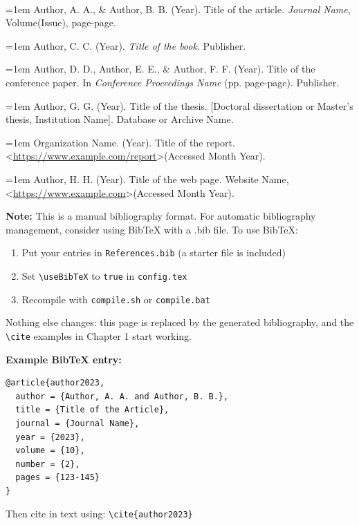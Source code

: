 
%
\begin{center}
\vspace*{2\baselineskip}
{\bf\fontsize{14pt}{14.5pt}\selectfont {Bibliography}}\\\vspace{1cm}
\end{center}

\setlength{\parindent}{0cm}



\hangindent=1em
Author, A. A., \& Author, B. B. (Year). Title of the article. \textit{Journal Name}, Volume(Issue), page-page.


\hangindent=1em
Author, C. C. (Year). \textit{Title of the book}. Publisher.


\hangindent=1em
Author, D. D., Author, E. E., \& Author, F. F. (Year). Title of the conference paper. In \textit{Conference Proceedings Name} (pp. page-page). Publisher.


\hangindent=1em
Author, G. G. (Year). Title of the thesis. [Doctoral dissertation or Master's thesis, Institution Name]. Database or Archive Name.


\hangindent=1em
Organization Name. (Year). Title of the report. \textless \url{https://www.example.com/report}\textgreater (Accessed Month Year).


\hangindent=1em
Author, H. H. (Year). Title of the web page. Website Name, \textless \url{https://www.example.com}\textgreater (Accessed Month Year).

\vspace{1cm}

\textbf{Note:} This is a manual bibliography format. For automatic bibliography management, consider using BibTeX with a .bib file. To use BibTeX:

\begin{enumerate}
    \item Put your entries in \texttt{References.bib} (a starter file is included)
    \item Set \texttt{\textbackslash useBibTeX} to \texttt{true} in \texttt{config.tex}
    \item Recompile with \texttt{compile.sh} or \texttt{compile.bat}
\end{enumerate}

Nothing else changes: this page is replaced by the generated bibliography, and the
\texttt{\textbackslash cite} examples in Chapter 1 start working.

\textbf{Example BibTeX entry:}

\begin{verbatim}
@article{author2023,
  author = {Author, A. A. and Author, B. B.},
  title = {Title of the Article},
  journal = {Journal Name},
  year = {2023},
  volume = {10},
  number = {2},
  pages = {123-145}
}
\end{verbatim}

Then cite in text using: \texttt{\textbackslash cite\{author2023\}}
